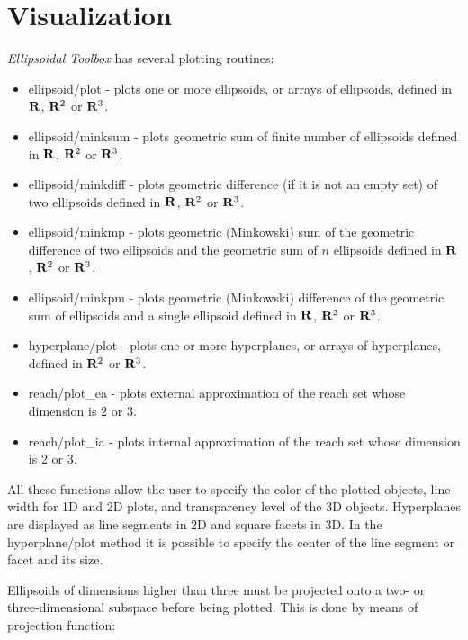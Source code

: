 \documentclass[letterpaper,10pt,english]{sphinxmanual}
\begin{document}
\section{Visualization}
\label{chap_implement:visualization}
\emph{Ellipsoidal Toolbox} has several plotting routines:
\begin{itemize}
\item {} 
ellipsoid/plot - plots one or more ellipsoids, or arrays of
ellipsoids, defined in ${\bf R}$, ${\bf R}^2$ or
${\bf R}^3$.

\item {} 
ellipsoid/minksum - plots geometric sum of finite number of
ellipsoids defined in ${\bf R}$, ${\bf R}^2$ or
${\bf R}^3$.

\item {} 
ellipsoid/minkdiff - plots geometric difference (if it is not an
empty set) of two ellipsoids defined in ${\bf R}$,
${\bf R}^2$ or ${\bf R}^3$.

\item {} 
ellipsoid/minkmp - plots geometric (Minkowski) sum of the geometric
difference of two ellipsoids and the geometric sum of $n$
ellipsoids defined in ${\bf R}$, ${\bf R}^2$ or
${\bf R}^3$.

\item {} 
ellipsoid/minkpm - plots geometric (Minkowski) difference of the
geometric sum of ellipsoids and a single ellipsoid defined in
${\bf R}$, ${\bf R}^2$ or ${\bf R}^3$.

\item {} 
hyperplane/plot - plots one or more hyperplanes, or arrays of
hyperplanes, defined in ${\bf R}^2$ or ${\bf R}^3$.

\item {} 
reach/plot\_ea - plots external approximation of the reach set whose
dimension is $2$ or $3$.

\item {} 
reach/plot\_ia - plots internal approximation of the reach set whose
dimension is $2$ or $3$.

\end{itemize}

All these functions allow the user to specify the color of the plotted
objects, line width for 1D and 2D plots, and transparency level of the
3D objects. Hyperplanes are displayed as line segments in 2D and square
facets in 3D. In the hyperplane/plot method it is possible to specify
the center of the line segment or facet and its size.

Ellipsoids of dimensions higher than three must be projected onto a two-
or three-dimensional subspace before being plotted. This is done by
means of projection function:
\end{document}
